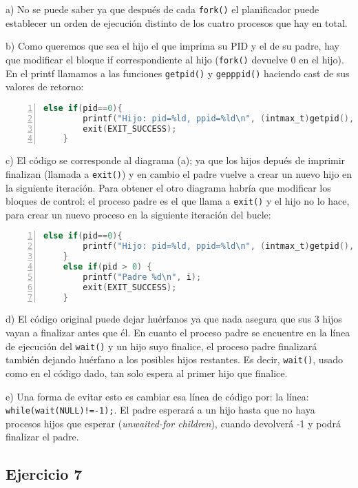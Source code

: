 \documentclass{article}
\begin{document}
a) No se puede saber ya que después de cada \texttt{fork()} el planificador puede establecer un orden de ejecución distinto de los cuatro procesos que hay en total.

b) Como queremos que sea el hijo el que imprima su PID y el de su padre, hay que modificar el bloque if correspondiente al hijo (\texttt{fork()} devuelve 0 en el hijo). En el printf llamamos a las funciones \texttt{getpid()} y \texttt{gepppid()} haciendo cast de sus valores de retorno:

\begin{lstlisting}[language=C, numbers=left]
    else if(pid==0){
        printf("Hijo: pid=%ld, ppid=%ld\n", (intmax_t)getpid(), (intmax_t)getppid());
        exit(EXIT_SUCCESS);
    }
\end{lstlisting}

c) El código se corresponde al diagrama (a); ya que los hijos depués de imprimir finalizan (llamada a \texttt{exit()}) y en cambio el padre vuelve a crear un nuevo hijo en la siguiente iteración. Para obtener el otro diagrama habría que modificar los bloques de control: el proceso padre es el que llama a \texttt{exit()} y el hijo no lo hace, para crear un nuevo proceso en la siguiente iteración del bucle:

\begin{lstlisting}[language=C, numbers=left]
    else if(pid==0){
        printf("Hijo: pid=%ld, ppid=%ld\n", (intmax_t)getpid(), (intmax_t)getppid());
    }
    else if(pid > 0) {
        printf("Padre %d\n", i);
        exit(EXIT_SUCCESS);
    }
\end{lstlisting}

d) El código original puede dejar huérfanos ya que nada asegura que sus 3 hijos vayan a finalizar antes que él. En cuanto el proceso padre se encuentre en la línea de ejecución del \texttt{wait()} y un hijo suyo finalice, el proceso padre finalizará también dejando huérfano a los posibles hijos restantes. Es decir, \texttt{wait()}, usado como en el código dado, tan solo espera al primer hijo que finalice.

e) Una forma de evitar esto es cambiar esa línea de código por: la línea: \texttt{while(wait(NULL)!=-1);}. El padre esperará a un hijo hasta que no haya procesos hijos que esperar (\textit{unwaited-for children}), cuando devolverá -1 y podrá finalizar el padre.  

\subsection*{Ejercicio 7}
\end{document}
